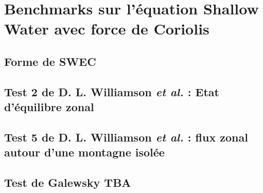 \chapter{Benchmarks sur l'équation Shallow Water avec force de Coriolis}

\section{Forme de SWEC}

\section{Test 2 de D. L. Williamson \textit{et al.} : Etat d'équilibre zonal}

\section{Test 5 de D. L. Williamson \textit{et al.} : flux zonal autour d'une montagne isolée}

\section{Test de Galewsky TBA}
